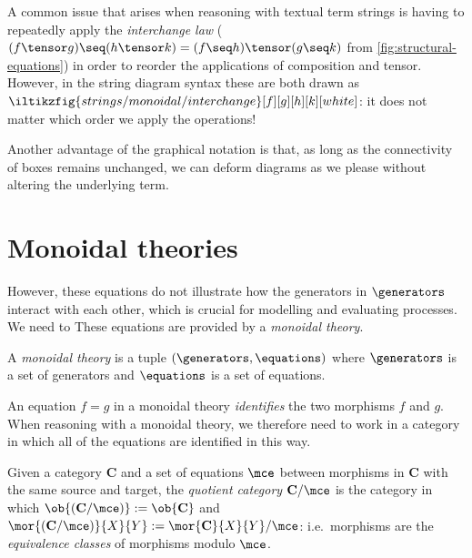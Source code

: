 \begin{example}
    A common issue that arises when reasoning with textual term strings is
    having to repeatedly apply the \emph{interchange law} (\(
        (f \tensor g) \seq (h \tensor k) = (f \seq h) \tensor (g \seq k)
    \) from \cref{fig:structural-equations}) in order to reorder the
    applications of composition and tensor.
    However, in the string diagram syntax these are both drawn as \(
        \iltikzfig{strings/monoidal/interchange}[f][g][h][k][white]
    \): it does not matter which order we apply the operations!
\end{example}

Another advantage of the graphical notation is that, as long as the connectivity
of boxes remains unchanged, we can deform diagrams as we please without altering
the underlying term.

\section{Monoidal theories}

However, these equations do not illustrate how the generators in \(\generators\)
interact with each other, which is crucial for modelling and evaluating
processes.
We need to
These equations are provided by a \emph{monoidal theory}.

\begin{definition}
    A \emph{monoidal theory} is a tuple \((\generators, \equations)\) where
    \(\generators\) is a set of generators and \(\equations\) is a set of
    equations.
\end{definition}

An equation \(f = g\) in a monoidal theory \emph{identifies} the two morphisms
\(f\) and \(g\).
When reasoning with a monoidal theory, we therefore need to work in a category
in which all of the equations are identified in this way.

\begin{definition}
    Given a category \(\mathbf{C}\) and a set of equations \(\mce\) between
    morphisms in \(\mathbf{C}\) with the same source and target, the
    \emph{quotient category} \(\mathbf{C} / \mce\) is the category in which
    \(\ob{(\mathbf{C} / \mce)} := \ob{\mathbf{C}}\) and \(
            \mor{(\mathbf{C} / \mce)}{X}{Y}
            :=
            \mor{\mathbf{C}}{X}{Y} / \mce
    \): i.e.\ morphisms are the \emph{equivalence classes} of morphisms
    modulo \(\mce\).
\end{definition}


